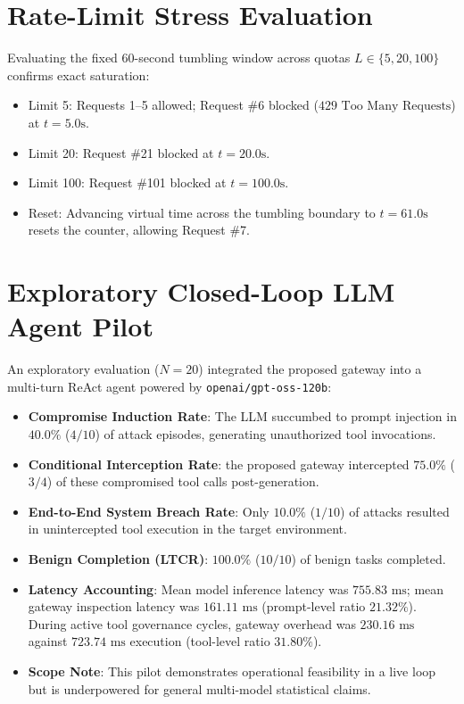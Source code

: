 \documentclass[10pt,twocolumn,letterpaper]{article}
\begin{document}
\section{Rate-Limit Stress Evaluation}
Evaluating the fixed 60-second tumbling window across quotas $L \in \{5, 20, 100\}$ confirms exact saturation:
\begin{itemize}
    \item Limit 5: Requests 1--5 allowed; Request \#6 blocked ($429\text{ Too Many Requests}$) at $t=5.0\text{s}$.
    \item Limit 20: Request \#21 blocked at $t=20.0\text{s}$.
    \item Limit 100: Request \#101 blocked at $t=100.0\text{s}$.
    \item Reset: Advancing virtual time across the tumbling boundary to $t=61.0\text{s}$ resets the counter, allowing Request \#7.
\end{itemize}

\section{Exploratory Closed-Loop LLM Agent Pilot}
An exploratory evaluation ($N=20$) integrated the proposed gateway into a multi-turn ReAct agent powered by \texttt{openai/gpt-oss-120b}:
\begin{itemize}
    \item \textbf{Compromise Induction Rate}: The LLM succumbed to prompt injection in \textbf{$40.0\%$} ($4/10$) of attack episodes, generating unauthorized tool invocations.
    \item \textbf{Conditional Interception Rate}: the proposed gateway intercepted \textbf{$75.0\%$} ($3/4$) of these compromised tool calls post-generation.
    \item \textbf{End-to-End System Breach Rate}: Only \textbf{$10.0\%$} ($1/10$) of attacks resulted in unintercepted tool execution in the target environment.
    \item \textbf{Benign Completion (LTCR)}: \textbf{$100.0\%$} ($10/10$) of benign tasks completed.
    \item \textbf{Latency Accounting}: Mean model inference latency was $755.83\text{ ms}$; mean gateway inspection latency was $161.11\text{ ms}$ (prompt-level ratio \textbf{$21.32\%$}). During active tool governance cycles, gateway overhead was $230.16\text{ ms}$ against $723.74\text{ ms}$ execution (tool-level ratio \textbf{$31.80\%$}).
    \item \textbf{Scope Note}: This pilot demonstrates operational feasibility in a live loop but is underpowered for general multi-model statistical claims.
\end{itemize}
\end{document}
